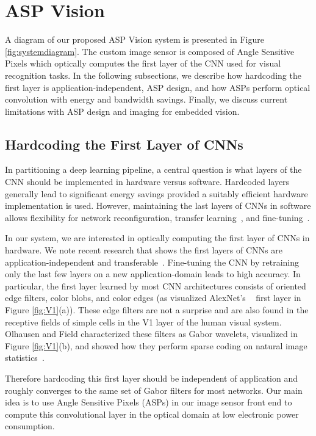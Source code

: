 \documentclass[10pt,twocolumn,letterpaper]{article}
\newcommand{\Section}[1]{\vspace{-4pt}\section{#1}\vspace{-4pt}}
\begin{document}
\Section{ASP Vision}
   \vspace{-0.5mm}
A diagram of our proposed ASP Vision system is presented in Figure \ref{fig:systemdiagram}. The custom image sensor is composed of Angle Sensitive Pixels which optically computes the first layer of the CNN used for visual recognition tasks. In the following subsections, we describe how hardcoding the first layer is application-independent, ASP design, and how ASPs perform optical convolution with energy and bandwidth savings. Finally, we discuss current limitations with ASP design and imaging for embedded vision.
\subsection{Hardcoding the First Layer of CNNs}
     In partitioning a deep learning pipeline, a central question is what layers of the CNN should be implemented in hardware versus software. Hardcoded layers generally lead to significant energy savings provided a suitably efficient hardware implementation is used. However, maintaining the last layers of CNNs in software allows flexibility for network reconfiguration, transfer learning~\cite{pan2010survey}, and fine-tuning~\cite{bengio2012deep}. 

In our system, we are interested in optically computing the first layer of CNNs in hardware. We note recent research that shows the first layers of CNNs are application-independent and transferable~\cite{yosinski2014transferable}. Fine-tuning the CNN by retraining only the last few layers on a new application-domain leads to high accuracy. In particular, the first layer learned by most CNN architectures consists of oriented edge filters, color blobs, and color edges (as visualized AlexNet's ~\cite{krizhevsky2012imagenet} first layer in Figure \ref{fig:V1}(a)). These edge filters are not a surprise and are also found in the receptive fields of simple cells in the V1 layer of the human visual system. Olhausen and Field characterized these filters as Gabor wavelets, visualized in Figure \ref{fig:V1}(b), and showed how they perform sparse coding on natural image statistics~\cite{olshausen1996emergence}. 

Therefore hardcoding this first layer should be independent of application and roughly converges to the same set of Gabor filters for most networks. Our main idea is to use Angle Sensitive Pixels (ASPs) in our image sensor front end to compute this convolutional layer in the optical domain at low electronic power consumption. 
\end{document}

